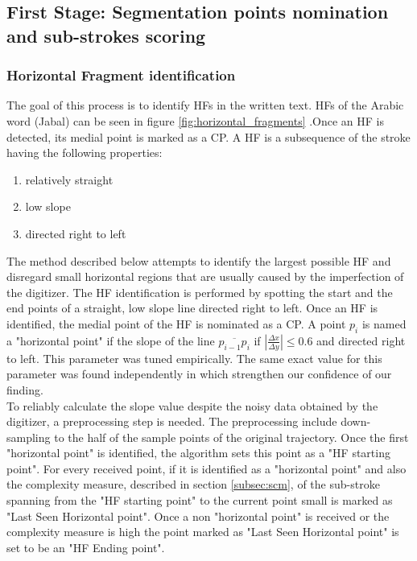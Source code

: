 \documentclass[journal,compsoc]{IEEEtran}
\begin{document}
\subsection{First Stage: Segmentation points nomination and sub-strokes scoring}
\subsubsection{Horizontal Fragment identification}
The goal of this process is to identify HFs in the written text. HFs of the Arabic word  (Jabal) can be seen in figure \ref{fig:horizontal_fragments} .Once an HF is detected, its medial point is marked as a CP. A HF is a subsequence of the stroke having the following properties: 
\begin{enumerate}
\item relatively straight
\item low slope
\item directed right to left 
\end{enumerate}
The method described below attempts to identify the largest possible HF and disregard small horizontal regions that are usually caused by the imperfection of the digitizer. The HF identification is performed by spotting the start and the end points of a straight, low slope line directed right to left. Once an HF is identified, the medial point of the HF is nominated as a CP.
A point $p_{i}$ is named a "horizontal point" if the slope of the line $\overline{p_{i-1}p_{i}}$ if $\left|\frac{\Delta x}{\Delta y}\right|\leq0.6$ and directed right to left. This parameter was tuned empirically.
The same exact value for this parameter was found independently in \cite{daifallah2009recognition} which strengthen our confidence of our finding.\\
To reliably calculate the slope value despite the noisy data obtained by the digitizer, a preprocessing step is needed. The preprocessing include down-sampling to the half of the sample points of the original trajectory.
Once the first "horizontal point" is identified, the algorithm sets this point as a "HF starting point". For every received point, if it is identified as a "horizontal point" and also the complexity measure, described in section \ref{subsec:scm}, of the sub-stroke spanning from the "HF starting point" to the current point small is marked as "Last Seen Horizontal point". Once a non "horizontal point" is received or the complexity measure is high the point marked as "Last Seen Horizontal point" is set to be an "HF Ending point".\\
\end{document}
